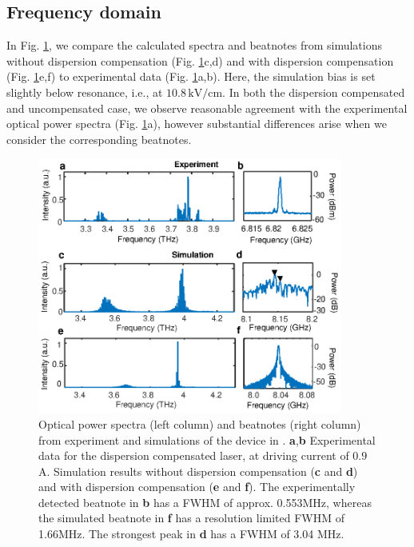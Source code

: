 \documentclass[10pt,letterpaper]{article}%
\begin{document}
\subsection{Frequency domain}

In Fig. \ref{fig:img05}, we compare the calculated spectra and beatnotes from
simulations without dispersion compensation (Fig. \ref{fig:img05}c,d) and with
dispersion compensation (Fig. \ref{fig:img05}e,f) to experimental data (Fig.
\ref{fig:img05}a,b). Here, the simulation bias is set slightly below
resonance, i.e., at $10.8{\,}\mathrm{kV}/\mathrm{cm}$. In both the dispersion
compensated and uncompensated case, we observe reasonable agreement
with the experimental optical power spectra (Fig. \ref{fig:img05}a), however
substantial differences arise when we consider the corresponding
beatnotes.\begin{figure}[h]
\begin{center}
\includegraphics[width=10cm]{figs/SPECTRA_EXPERIMENT.eps}
\end{center}
\caption{ Optical power spectra (left column) and beatnotes (right column)
from experiment and simulations of the device in \cite{burghoff2014terahertz}.
\textbf{a},\textbf{b} Experimental data for the dispersion compensated laser,
at driving current of $0.9$ A. Simulation results without dispersion
compensation (\textbf{c} and \textbf{d}) and with dispersion compensation
(\textbf{e} and \textbf{f}). The experimentally detected beatnote in
\textbf{b} has a FWHM of approx. 0.553MHz, whereas the simulated beatnote in
\textbf{f} has a resolution limited FWHM of 1.66MHz. The strongest peak in \textbf{d}
has a FWHM of 3.04 MHz.}%
\label{fig:img05}%
\end{figure}
\end{document}
